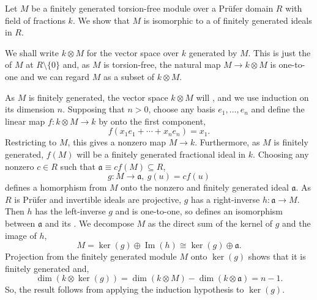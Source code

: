 \documentclass[12pt]{article}
\begin{document}
Let $M$ be a finitely generated torsion-free module over a Pr\"ufer domain $R$ with field of fractions $k$. We show that $M$ is isomorphic to a  of finitely generated ideals in $R$.

We shall write $k\otimes M$ for the vector space over $k$ generated by $M$. This is just the  of $M$ at $R\setminus\{0\}$ and, as $M$ is torsion-free, the natural map $M\rightarrow k\otimes M$ is one-to-one and we can regard $M$ as a subset of $k\otimes M$.

As $M$ is finitely generated, the vector space $k\otimes M$ will , and we use induction on its dimension $n$.
Supposing that $n>0$, choose any basis $e_1,\ldots,e_n$ and define the linear map $f\colon k\otimes M\rightarrow k$ by  onto the first component,
\begin{equation*}
f(x_1e_1+\cdots+x_ne_n)=x_1.
\end{equation*}
Restricting to $M$, this gives a nonzero map $M\rightarrow k$. Furthermore, as $M$ is finitely generated, $f(M)$ will be a finitely generated fractional ideal in $k$. Choosing any nonzero $c\in R$ such that $\mathfrak{a}\equiv cf(M)\subseteq R$,
\begin{equation*}
g\colon M\rightarrow\mathfrak{a},\ g(u)=cf(u)
\end{equation*}
defines a homorphism from $M$ onto the nonzero and finitely generated ideal $\mathfrak{a}$. As $R$ is Pr\"ufer and invertible ideals are projective, $g$ has a right-inverse $h\colon\mathfrak{a}\rightarrow M$.
Then $h$ has the left-inverse $g$ and is one-to-one, so defines an isomorphism between $\mathfrak{a}$ and its . We decompose $M$ as the direct sum of the kernel of $g$ and the image of $h$,
\begin{equation*}
M = \operatorname{ker}(g)\oplus \operatorname{Im}(h)\cong\operatorname{ker}(g)\oplus \mathfrak{a}.
\end{equation*}
Projection from the finitely generated module $M$ onto $\operatorname{ker}(g)$ shows that it is finitely generated and,
\begin{equation*}
\operatorname{dim}(k\otimes\operatorname{ker}(g))=\operatorname{dim}(k\otimes M)-\operatorname{dim}(k\otimes\mathfrak{a})=n-1.
\end{equation*}
So, the result follows from applying the induction hypothesis to $\operatorname{ker}(g)$.

\end{document}
